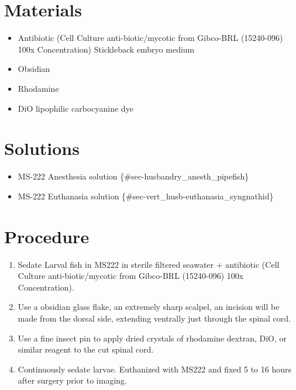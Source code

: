 \documentclass[
  letterpaper,
  DIV=11,
  numbers=noendperiod]{scrreprt}
\providecommand{\tightlist}{%
  \setlength{\itemsep}{0pt}\setlength{\parskip}{0pt}}\usepackage{longtable,booktabs,array}
\begin{document}
\hypertarget{materials-80}{%
\section{Materials}\label{materials-80}}

\begin{itemize}
\tightlist
\item
  Antibiotic (Cell Culture anti-biotic/mycotic from Gibco-BRL
  (15240-096) 100x Concentration) Stickleback embryo medium
\item
  Obsidian
\item
  Rhodamine
\item
  DiO lipophilic carbocyanine dye
\end{itemize}

\hypertarget{solutions-72}{%
\section{Solutions}\label{solutions-72}}

\begin{itemize}
\tightlist
\item
  MS-222 Anesthesia solution \{\#sec-husbandry\_anesth\_pipefish\}
\item
  MS-222 Euthanasia solution \{\#sec-vert\_husb-euthanasia\_syngnathid\}
\end{itemize}

\hypertarget{procedure-80}{%
\section{Procedure}\label{procedure-80}}

\begin{enumerate}
\def\labelenumi{\arabic{enumi}.}
\tightlist
\item
  Sedate Larval fish in MS222 in sterile filtered seawater + antibiotic
  (Cell Culture anti-biotic/mycotic from Gibco-BRL (15240-096) 100x
  Concentration).
\item
  Use a obsidian glass flake, an extremely sharp scalpel, an incision
  will be made from the dorsal side, extending ventrally just through
  the spinal cord.
\item
  Use a fine insect pin to apply dried crystals of rhodamine dextran,
  DiO, or similar reagent to the cut spinal cord.
\item
  Continuously sedate larvae. Euthanized with MS222 and fixed 5 to 16
  hours after surgery prior to imaging.
\end{enumerate}
\end{document}
